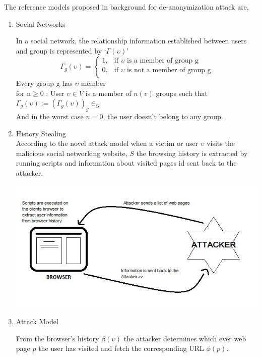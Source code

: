 \documentclass{article}
\begin{document}
The reference models proposed in background for de-anonymization attack are,\\
\begin{enumerate}
\item Social Networks

	In a social network, the relationship information established between users and group is represented by `$\Gamma(\upsilon)$'\\
\begin{equation*}	
\Gamma_g(\upsilon)=
\begin{cases}
1, & \text{if } \upsilon \text{ is a member of group g}\\
0, & \text{if } \upsilon \text{ is not a member of group g}\\
\end{cases}
\end{equation*}
Every group g has $\upsilon$ member\\
$\text{for n}\geq0$ : User $\upsilon \in {V}$ is a member of $n(v)$ groups such that \\
$\Gamma_g(\upsilon):=(\Gamma_g(\upsilon))_g \in _G $\\
And in the worst case $n=0$, the user doesn't belong to any group.\\

\item History Stealing\\
	According to the novel attack model when a victim or user $\upsilon$ visits the malicious social networking website, $S$ the browsing history is extracted by running scripts and information about visited pages id sent back to the attacker.

\includegraphics[scale=0.5]{History Stealing.jpg}
	
\item Attack Model

	From the browser's history $\beta(\upsilon)$ the attacker determines which ever web page $p$ the user has visited and fetch the corresponding URL $\phi(p)$.	
	

\end{enumerate}
\end{document}
